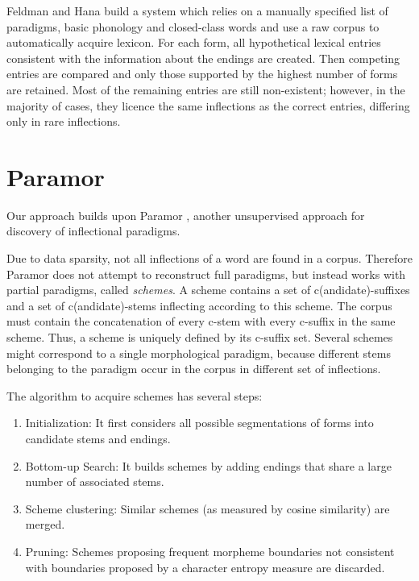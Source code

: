 \documentclass{itatnew}
\begin{document}
Feldman and Hana \cite{hana-etal-2004-emnlp,feldman-hana-2010-rodopi}
build a system which relies on a manually specified list of paradigms, basic phonology and closed-class words and use a raw corpus to automatically acquire lexicon. For each form, all hypothetical lexical entries consistent with the information about the endings are created. Then competing entries are compared and only those supported by the highest number of forms are retained. Most of the remaining entries are still non-existent; however, in the majority of cases, they licence the same inflections as the correct entries, differing only in rare inflections.


\section{Paramor}
\label{sec:paramor}

Our approach builds upon Paramor \cite{monson09, monson07a, monson07b}, another unsupervised approach for discovery of inflectional paradigms.

Due to data sparsity, not all inflections of a word are found in a corpus. Therefore Paramor does not attempt to reconstruct 
full paradigms, but instead works with partial paradigms, called \emph{schemes}. A scheme contains a set of c(andidate)-suffixes and a set of c(andidate)-stems inflecting according to this scheme. The corpus must contain the concatenation of every c-stem with every c-suffix in the same scheme. Thus, a scheme is uniquely defined by its c-suffix set. Several schemes might correspond to a single morphological paradigm, because different stems belonging to the paradigm occur in the corpus in different set of inflections.

The algorithm to acquire schemes has several steps:
\begin{enumerate}
\item Initialization: It first considers all possible segmentations of forms into candidate stems and endings.
\item Bottom-up Search: It builds schemes by adding endings that share a large number of associated stems.
\item Scheme clustering: Similar schemes (as measured by cosine similarity) are merged.
\item Pruning: Schemes proposing frequent morpheme boundaries not consistent with boundaries proposed by a character entropy measure are discarded.
\end{enumerate}
\end{document}
